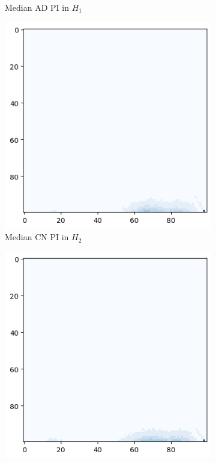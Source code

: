 \documentclass{article}
\begin{document}
\begin{figure}[htb]
\begin{subfigure}{0.32\textwidth}
    \caption{Median AD PI in $H_1 $}
  \end{subfigure}
  \begin{subfigure}{0.32\textwidth}
    \includegraphics[width=\textwidth]{figures/median_pis/median_pi_CN_h_2_rep.png}
    \caption{Median CN PI in $H_2$}
  \end{subfigure}
  \begin{subfigure}{0.32\textwidth}
    \includegraphics[width=\textwidth]{figures/median_pis/median_pi_MCI_h_2_rep.png}

\end{subfigure}
\end{figure}
\end{document}
